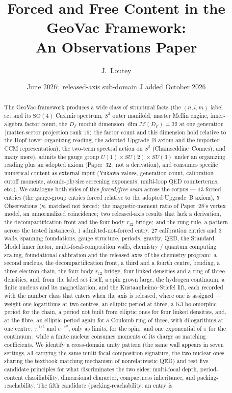 \documentclass[11pt,a4paper]{article}
\title{Forced and Free Content in the GeoVac Framework:\\ An Observations Paper}
\author{J.~Loutey}
\date{June 2026;\ released-axis sub-domain J added October 2026}
\theoremstyle{plain}
\theoremstyle{definition}
\newcommand{\Mcal}{\mathcal{M}}
\newcommand{\DF}{D_F}
\newcommand{\sphere}[1]{S^{#1}}
\begin{document}
\maketitle

\begin{abstract}
The GeoVac framework produces a wide class of structural facts (the $(n,l,m)$ label set and its $\mathrm{SO}(4)$ Casimir spectrum, $\sphere{3}$ outer manifold, master Mellin engine, inner-algebra factor count, the $D_F$ moduli dimension $\dim \Mcal(\DF) = 32$ at one generation (matter-sector projection rank $16$;\ the factor count and this dimension hold relative to the Hopf-tower organizing reading, the adopted Upgrade~B axiom and the imported CCM representation), the two-term spectral action on $\sphere{3}$ (Chamseddine--Connes), and many more), admits the gauge group $U(1) \times SU(2) \times SU(3)$ under an organizing reading plus an adopted axiom (Paper~32;\ not a derivation), and consumes specific numerical content as external input (Yukawa values, generation count, calibration cutoff moments, atomic-physics screening exponents, multi-loop QED counterterms, etc.). We catalogue both sides of this \emph{forced/free seam} across the corpus --- 43 forced entries (the gauge-group entries forced relative to the adopted Upgrade~B axiom), 5 Observations ($\kappa$, matched not forced;\ the magnetic-moment ratio of Paper~28's vertex model, an unnormalized coincidence;\ two released-axis results that lack a derivation, the decompactification front and the four-body $r_{12}$ bridge;\ and the rung rule, a pattern across the tested instances), 1 admitted-not-forced entry, 27 calibration entries and 3 walls, spanning foundations, gauge structure, periods, gravity, QED, the Standard Model inner factor, multi-focal-composition walls, chemistry / quantum computing scaling, foundational calibration and the released axes of the chemistry program:\ a second nucleus, the decompactification front, a third and a fourth centre, bending, a three-electron chain, the four-body $r_{12}$ bridge, four linked densities and a ring of three densities, and, from the label set itself, a spin grown large, the hydrogen continuum, a finite nucleus and its magnetization, and the Kustaanheimo--Stiefel lift, each recorded with the number class that enters when the axis is released, where one is assigned --- weight-one logarithms at two centres, an elliptic period at three, a K3 holomorphic period for the chain, a period not built from elliptic ones for four linked densities, and, at the fibre, an elliptic period again for a Coulomb ring of three, with dilogarithms at one centre;\ $\pi^{1/2}$ and $e^{-x^2}$, only as limits, for the spin;\ and one exponential of $\pi$ for the continuum;\ while a finite nucleus consumes moments of its charge as matching coefficients. We identify a cross-domain unity pattern (the same wall appears in seven settings, all carrying the same multi-focal-composition signature, the two nuclear ones sharing the textbook matching mechanism of nonrelativistic QED) and test five candidate principles for what discriminates the two sides: multi-focal depth, period-content classifiability, dimensional character, compactness inheritance, and packing-reachability. The fifth candidate (packing-reachability:  an entry is 
\end{abstract}
\end{document}
